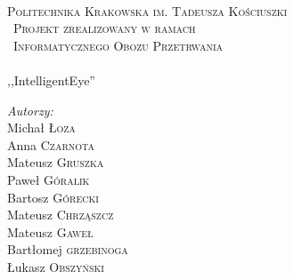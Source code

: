 \begin{titlepage}

\begin{center}
\\[1cm]
\textsc{\Large Politechnika Krakowska im. Tadeusza Kościuszki}\\[1.5cm]
\textsc{\ Projekt zrealizowany w ramach}\\
\textsc{\ Informatycznego Obozu Przetrwania}\\[0.5cm]
\HRule \\[0.4cm]
{ \Huge,,IntelligentEye'' }
\HRule \\[1.4cm]

\begin{minipage}[t]{0.4\textwidth}
\begin{flushleft} \large
\emph{Autorzy:}\\[0.1cm]
Michał \textsc{Łoza}\\
Anna \textsc{Czarnota}\\
Mateusz \textsc{Gruszka}\\
Paweł \textsc{Góralik}\\
Bartosz \textsc{Górecki}\\
Mateusz \textsc{Chrząszcz}\\
Mateusz \textsc{Gaweł}\\
Bartłomej \textsc{grzebinoga}\\
Łukasz \textsc{Obszyński}


\end{flushleft}
\end{minipage}
\end{center}
\end{titlepage}
